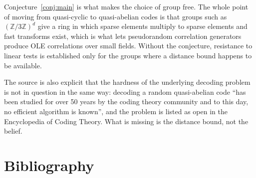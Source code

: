 \documentclass{aicr-conjecture}
\begin{document}
\begin{remark}\label{rem:why}
Conjecture~\ref{conj:main} is what makes the choice of group free. The
whole point of moving from quasi-cyclic to quasi-abelian codes is that
groups such as $(\mathbb{Z}/3\mathbb{Z})^{d}$ give a ring in which sparse
elements multiply to sparse elements and fast transforms exist, which is
what lets pseudorandom correlation generators produce OLE correlations
over small fields. Without the conjecture, resistance to linear tests is
established only for the groups where a distance bound happens to be
available.

The source is also explicit that the hardness of the underlying decoding
problem is not in question in the same way: decoding a random
quasi-abelian code ``has been studied for over 50 years by the coding
theory community and to this day, no efficient algorithm is known'', and
the problem is listed as open in the Encyclopedia of Coding Theory. What
is missing is the distance bound, not the belief.
\end{remark}

\section{Bibliography}
\end{document}
